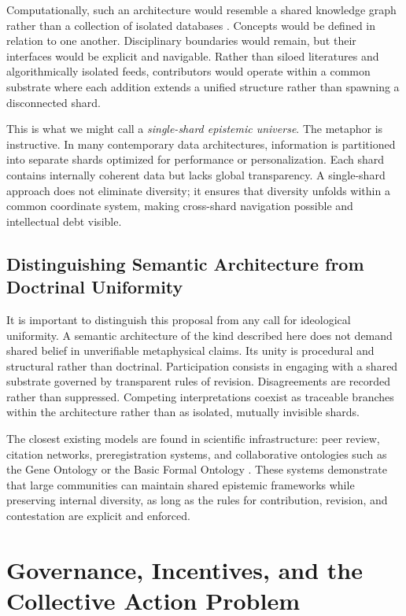 \documentclass[12pt]{article}
\theoremstyle{definition}
\theoremstyle{plain}
\begin{document}
Computationally, such an architecture would resemble a shared knowledge graph rather than a collection of isolated databases \citep{HoganEtAl2021}. Concepts would be defined in relation to one another. Disciplinary boundaries would remain, but their interfaces would be explicit and navigable. Rather than siloed literatures and algorithmically isolated feeds, contributors would operate within a common substrate where each addition extends a unified structure rather than spawning a disconnected shard.

This is what we might call a \emph{single-shard epistemic universe}. The metaphor is instructive. In many contemporary data architectures, information is partitioned into separate shards optimized for performance or personalization. Each shard contains internally coherent data but lacks global transparency. A single-shard approach does not eliminate diversity; it ensures that diversity unfolds within a common coordinate system, making cross-shard navigation possible and intellectual debt visible.

\subsection{Distinguishing Semantic Architecture from Doctrinal Uniformity}

It is important to distinguish this proposal from any call for ideological uniformity. A semantic architecture of the kind described here does not demand shared belief in unverifiable metaphysical claims. Its unity is procedural and structural rather than doctrinal. Participation consists in engaging with a shared substrate governed by transparent rules of revision. Disagreements are recorded rather than suppressed. Competing interpretations coexist as traceable branches within the architecture rather than as isolated, mutually invisible shards.

The closest existing models are found in scientific infrastructure: peer review, citation networks, preregistration systems, and collaborative ontologies such as the Gene Ontology or the Basic Formal Ontology \citep{Smith2007}. These systems demonstrate that large communities can maintain shared epistemic frameworks while preserving internal diversity, as long as the rules for contribution, revision, and contestation are explicit and enforced.

\section{Governance, Incentives, and the Collective Action Problem}
\label{sec:governance}
\end{document}
